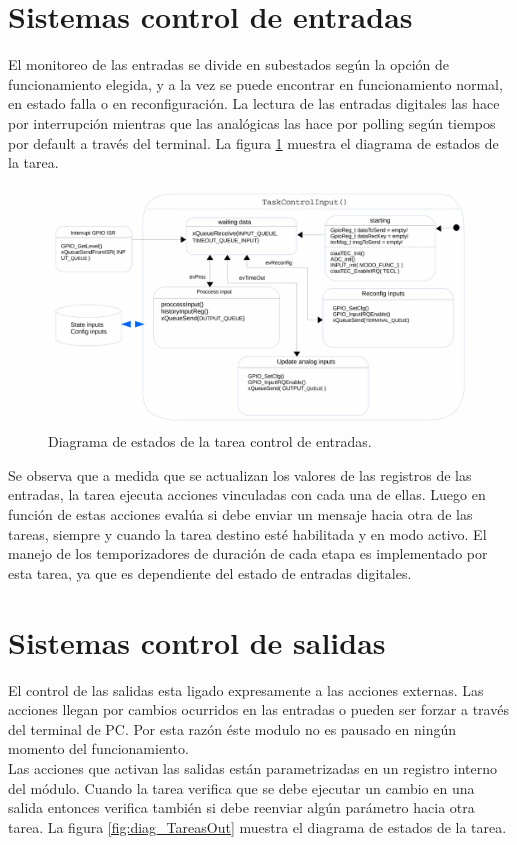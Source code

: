 \section{ Sistemas control de entradas }
El monitoreo de las entradas se divide en subestados según la opción de funcionamiento elegida, y a la vez se puede encontrar en funcionamiento normal, en estado falla o en reconfiguración. 
La lectura de las entradas digitales las hace por interrupción mientras que las analógicas las hace por polling según tiempos por default a través del terminal. La figura \ref{fig:diag_TareasInp} muestra el diagrama de estados de la tarea.
 
\begin{figure}[h!]
	\centering
	\includegraphics[width=1.2\textwidth]{Figures/Cap_3/diagrama_tarea_inp}
	\caption{ Diagrama de estados de la tarea control de entradas. }
	\label{fig:diag_TareasInp}
\end{figure}

Se observa que a medida que se actualizan los valores de las registros de las entradas, la tarea ejecuta acciones vinculadas con cada una de ellas. Luego en función de estas acciones evalúa si debe enviar un mensaje hacia otra de las tareas, siempre y cuando la tarea destino esté habilitada y en modo activo.
El manejo de los temporizadores de duración de cada etapa es implementado por esta tarea, ya que es dependiente del estado de entradas digitales.   

\section{ Sistemas control de salidas }
El control de las salidas esta ligado expresamente a las acciones externas. Las acciones llegan por cambios ocurridos en las entradas o pueden ser forzar a través del terminal de PC. Por esta razón éste modulo no es pausado en ningún momento del funcionamiento.\\
Las acciones que activan las salidas están parametrizadas en un registro interno del módulo. Cuando la tarea verifica que se debe ejecutar un cambio en una salida entonces verifica también si debe reenviar algún parámetro hacia otra tarea.
La figura \ref{fig:diag_TareasOut} muestra el diagrama de estados de la tarea.
 

